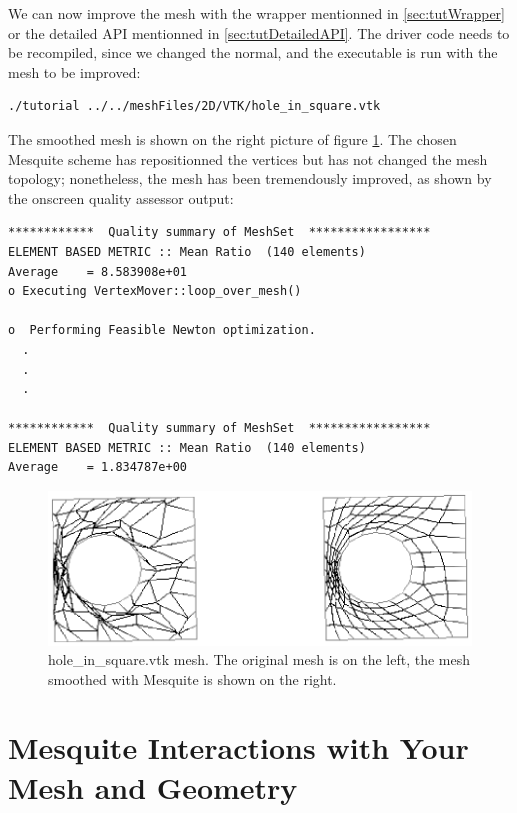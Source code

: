 \documentclass[letter]{report}
\begin{document}
We can now improve the mesh with the wrapper mentionned in \ref{sec:tutWrapper} or the detailed API
mentionned in \ref{sec:tutDetailedAPI}. The driver code needs to be recompiled, since we changed the
normal, and the executable is run with the mesh to be improved:
\begin{verbatim}
./tutorial ../../meshFiles/2D/VTK/hole_in_square.vtk
\end{verbatim}
The smoothed mesh is shown on the right picture of figure
\ref{fig:hole}. The chosen Mesquite scheme has repositionned the vertices but has not changed the
mesh topology; nonetheless, the mesh has been tremendously improved, as shown by the onscreen
quality assessor output: 
\begin{verbatim}
************  Quality summary of MeshSet  *****************
ELEMENT BASED METRIC :: Mean Ratio  (140 elements)
Average    = 8.583908e+01
o Executing VertexMover::loop_over_mesh()

o  Performing Feasible Newton optimization.
  .
  .
  .

************  Quality summary of MeshSet  *****************
ELEMENT BASED METRIC :: Mean Ratio  (140 elements)
Average    = 1.834787e+00
\end{verbatim}
\begin{figure}[htbp]
\begin{center}
    \includegraphics{hole_in_square.ps}
    \caption{hole\_in\_square.vtk mesh. The original mesh is on the left, the mesh smoothed with
    Mesquite is shown on the right.}
    \label{fig:hole}
\end{center}
\end{figure}


\chapter{Mesquite Interactions with Your Mesh and Geometry}
\label{sec:meshes}
\end{document}
